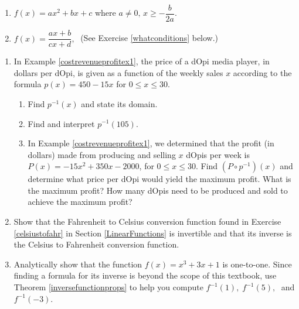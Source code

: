 \begin{multicols}{2}
\begin{enumerate}
\setcounter{enumi}{\value{HW}}
\item $f(x) = ax^{2} + bx + c$ where $a \neq 0, \, x \geq -\dfrac{b}{2a}$.

\item $f(x) = \dfrac{ax + b}{cx + d},\;$ (See Exercise \ref{whatconditions} below.) \label{genericinverselast}

\setcounter{HW}{\value{enumi}}
\end{enumerate}
\end{multicols}


\begin{enumerate}
\setcounter{enumi}{\value{HW}}

\item  In Example \ref{costrevenueprofitex1}, the price of a dOpi media player, in dollars per dOpi, is given as a function of the weekly sales $x$ according to the formula $p(x) = 450-15x$ for $0 \leq x \leq 30$.

\begin{enumerate}

\item  Find $p^{-1}(x)$ and state its domain.

\item  Find and interpret $p^{-1}(105)$.

\item  In Example \ref{costrevenueprofitex1}, we determined that the profit (in dollars) made from producing and selling $x$ dOpis per week is $P(x)= -15x^2+350x-2000$, for $0 \leq x \leq 30$.  Find $\left(P \circ p^{-1}\right)(x)$ and determine what price per dOpi would yield the maximum profit.  What is the maximum profit?  How many dOpis need to be produced and sold to achieve the maximum profit?


\end{enumerate}

\item Show that the Fahrenheit to Celsius conversion function found in Exercise \ref{celsiustofahr} in Section \ref{LinearFunctions} is invertible and that its inverse is the Celsius to Fahrenheit conversion function.

\item Analytically show that the function $f(x) = x^3 + 3x + 1$ is one-to-one.  Since finding a formula for its inverse is beyond the scope of this textbook, use Theorem \ref{inversefunctionprops} to help you compute $f^{-1}(1), \; f^{-1}(5), \;$ and $f^{-1}(-3)$.



\end{enumerate}
